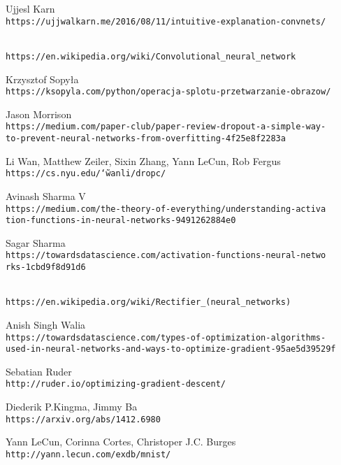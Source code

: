 \begin{thebibliography}{99}
Ujjesl Karn
\\\texttt{https://ujjwalkarn.me/2016/08/11/intuitive-explanation-convnets/}

\\\texttt{https://en.wikipedia.org/wiki/Convolutional\_neural\_network}

Krzysztof Sopyła
\\\texttt{https://ksopyla.com/python/operacja-splotu-przetwarzanie-obrazow/}

Jason Morrison
\\\texttt{https://medium.com/paper-club/paper-review-dropout-a-simple-way-\\to-prevent-neural-networks-from-overfitting-4f25e8f2283a}

Li Wan, Matthew Zeiler, Sixin Zhang, Yann LeCun, Rob Fergus
\\\texttt{https://cs.nyu.edu/\char`\~wanli/dropc/}

Avinash Sharma V
\\\texttt{https://medium.com/the-theory-of-everything/understanding-activa\\tion-functions-in-neural-networks-9491262884e0}

Sagar Sharma
\\\texttt{https://towardsdatascience.com/activation-functions-neural-netwo\\rks-1cbd9f8d91d6}

\\\texttt{https://en.wikipedia.org/wiki/Rectifier\_(neural\_networks)}

Anish Singh Walia
\\\texttt{https://towardsdatascience.com/types-of-optimization-algorithms-\\used-in-neural-networks-and-ways-to-optimize-gradient-95ae5d39529f}

Sebatian Ruder
\\\texttt{http://ruder.io/optimizing-gradient-descent/}

Diederik P.Kingma, Jimmy Ba
\\\texttt{https://arxiv.org/abs/1412.6980}

Yann LeCun, Corinna Cortes, Christoper J.C. Burges
\\\texttt{http://yann.lecun.com/exdb/mnist/}


\end{thebibliography}
